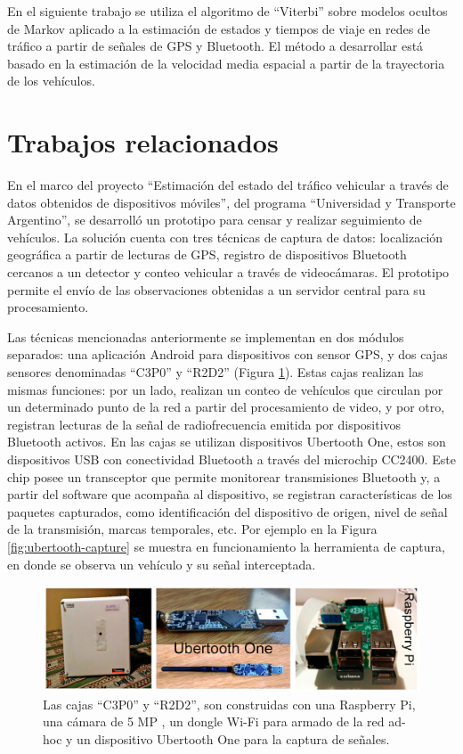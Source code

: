 En el siguiente trabajo se utiliza el algoritmo de “Viterbi” sobre modelos ocultos de Markov aplicado a la estimación de estados y tiempos de viaje en redes de tráfico a partir de señales de GPS y Bluetooth. El método a desarrollar está basado en la estimación de la velocidad media espacial a partir de la trayectoria de los vehículos. 

\section{Trabajos relacionados}
\label{sec:trabajosrelacionados}
En el marco del proyecto ``Estimación del estado del tráfico vehicular a través de datos obtenidos de dispositivos móviles'', del programa ``Universidad y Transporte Argentino'',  se desarrolló un prototipo para censar y realizar seguimiento de vehículos. La solución cuenta con tres técnicas de captura de datos: localización geográfica a partir de lecturas de GPS, registro de dispositivos Bluetooth cercanos a un detector y conteo vehicular a través de videocámaras. El prototipo permite el envío de las observaciones obtenidas a un servidor central para su procesamiento. 

Las técnicas mencionadas anteriormente se implementan en dos módulos separados: una aplicación Android para dispositivos con sensor GPS, y dos cajas sensores denominadas ``C3P0'' y ``R2D2'' (Figura \ref{fig:c3p0}). Estas cajas realizan las mismas funciones: por un lado, realizan un conteo de vehículos que circulan por un determinado punto de la red a partir del procesamiento de video, y por otro, registran lecturas de la señal de radiofrecuencia emitida por dispositivos Bluetooth activos. En las cajas se utilizan dispositivos Ubertooth One\cite{ossmann2012project}, estos son dispositivos USB con conectividad Bluetooth a través del microchip CC2400. Este chip posee un transceptor que permite monitorear transmisiones Bluetooth y, a partir del software que acompaña al dispositivo, se registran características de los paquetes capturados, como identificación del dispositivo de origen, nivel de señal de la transmisión, marcas temporales, etc. Por ejemplo en la Figura \ref{fig:ubertooth-capture} se muestra en funcionamiento la herramienta de captura, en donde se observa un vehículo y su señal interceptada.

\begin{figure}[!htp]
\centering
\captionsetup{width=.9\linewidth}
\includegraphics[width=0.9\linewidth]{images/c3p0.png}
\caption{Las cajas ``C3P0'' y ``R2D2'', son construidas con una Raspberry Pi, una cámara de 5 MP , un dongle Wi-Fi para armado de la red ad-hoc y un dispositivo Ubertooth One para la captura de señales. }
\label{fig:c3p0}
\end{figure}

